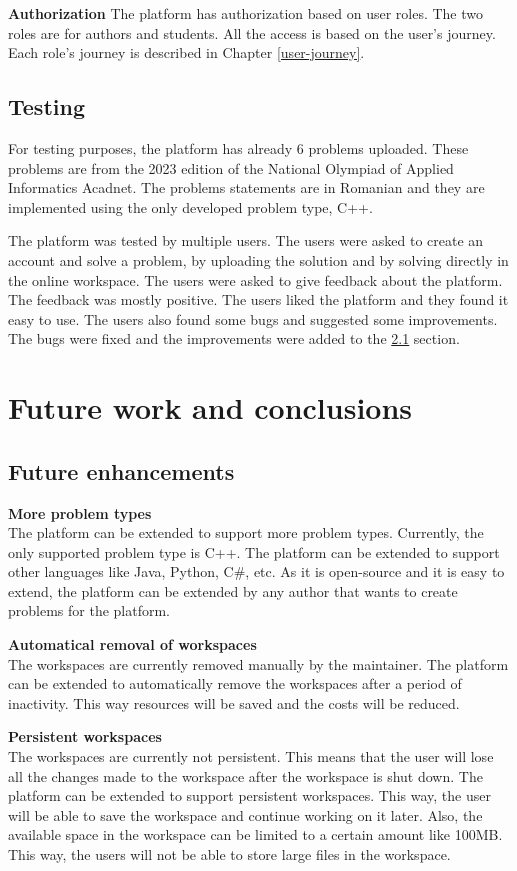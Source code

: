 \documentclass[12pt,a4paper]{report}
\begin{document}
\textbf{Authorization}
The platform has authorization based on user roles. The two roles are for authors and students. All the access is based on the user's journey. Each role's journey is described in Chapter \ref{user-journey}.

\section{Testing}
For testing purposes, the platform has already 6 problems uploaded. These problems are from the 2023 edition of the National Olympiad of Applied Informatics Acadnet. The problems statements are in Romanian and they are implemented using the only developed problem type, C++.

The platform was tested by multiple users. The users were asked to create an account and solve a problem, by uploading the solution and by solving directly in the online workspace. The users were asked to give feedback about the platform. The feedback was mostly positive. The users liked the platform and they found it easy to use. The users also found some bugs and suggested some improvements. The bugs were fixed and the improvements were added to the \ref{future-work} section.


\chapter{Future work and conclusions}
\section{Future enhancements}
\label{future-work}
\textbf{More problem types}
\\
The platform can be extended to support more problem types. Currently, the only supported problem type is C++. The platform can be extended to support other languages like Java, Python, C\#, etc. As it is open-source and it is easy to extend, the platform can be extended by any author that wants to create problems for the platform.

\textbf{Automatical removal of workspaces}
\\
The workspaces are currently removed manually by the maintainer. The platform can be extended to automatically remove the workspaces after a period of inactivity. This way resources will be saved and the costs will be reduced.

\textbf{Persistent workspaces}
\\
The workspaces are currently not persistent. This means that the user will lose all the changes made to the workspace after the workspace is shut down. The platform can be extended to support persistent workspaces. This way, the user will be able to save the workspace and continue working on it later. Also, the available space in the workspace can be limited to a certain amount like 100MB. This way, the users will not be able to store large files in the workspace.
\end{document}
